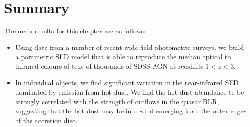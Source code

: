 \section{Summary}

The main results for this chapter are as follows:

\begin{itemize}

\item Using data from a number of recent wide-field photometric surveys, we build a parametric SED model that is able to reproduce the median optical to infrared colours of tens of thousands of SDSS AGN at redshifts $1 < z < 3$.

\item In individual objects, we find significant variation in the near-infrared SED dominated by emission from hot dust. We find the hot dust abundance to be strongly correlated with the strength of outflows in the quasar BLR, suggesting that the hot dust may be in a wind emerging from the outer edges of the accretion disc.



\end{itemize}
